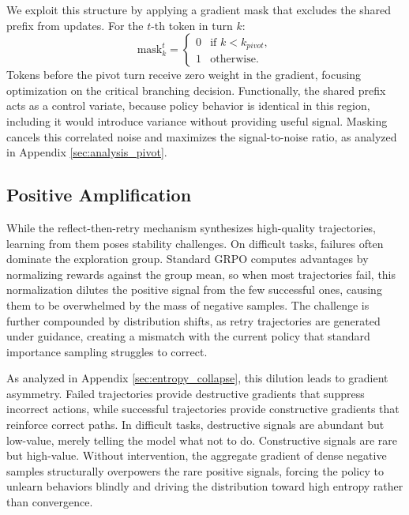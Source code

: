 \documentclass[11pt]{article}
\theoremstyle{definition}
\theoremstyle{remark}
\begin{document}
We exploit this structure by applying a gradient mask that excludes the shared prefix from updates. For the $t$-th token in turn $k$:
\begin{equation}
    \text{mask}_k^t = \begin{cases}
        0 & \text{if } k < k_{pivot}, \\
        1 & \text{otherwise}.
    \end{cases}
\end{equation}
Tokens before the pivot turn receive zero weight in the gradient, focusing optimization on the critical branching decision. Functionally, the shared prefix acts as a control variate, because policy behavior is identical in this region, including it would introduce variance without providing useful signal. Masking cancels this correlated noise and maximizes the signal-to-noise ratio, as analyzed in Appendix \ref{sec:analysis_pivot}.

\subsection{Positive Amplification}
\label{sec:positive_amplification}
While the reflect-then-retry mechanism synthesizes high-quality trajectories, learning from them poses stability challenges. On difficult tasks, failures often dominate the exploration group. Standard GRPO computes advantages by normalizing rewards against the group mean, so when most trajectories fail, this normalization dilutes the positive signal from the few successful ones, causing them to be overwhelmed by the mass of negative samples. The challenge is further compounded by distribution shifts, as retry trajectories are generated under guidance, creating a mismatch with the current policy that standard importance sampling struggles to correct.

As analyzed in Appendix \ref{sec:entropy_collapse}, this dilution leads to gradient asymmetry. Failed trajectories provide destructive gradients that suppress incorrect actions, while successful trajectories provide constructive gradients that reinforce correct paths. In difficult tasks, destructive signals are abundant but low-value, merely telling the model what not to do. Constructive signals are rare but high-value. Without intervention, the aggregate gradient of dense negative samples structurally overpowers the rare positive signals, forcing the policy to unlearn behaviors blindly and driving the distribution toward high entropy rather than convergence.
\end{document}
